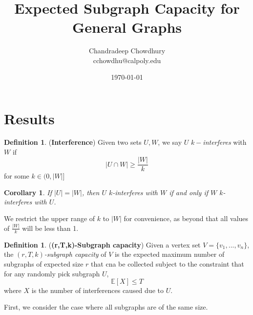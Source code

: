 \documentclass[10pt]{extarticle}
\title{\textbf{Expected Subgraph Capacity for General Graphs}}
\author{Chandradeep Chowdhury \\ cchowdhu@calpoly.edu}
\date{\today}
\newcommand{\E}{\mathbb{E}}
\newtheorem{corollary}[theorem]{Corollary}
\theoremstyle{definition}
\newtheorem{definition}[theorem]{Definition}
\begin{document}

\section{Results}

\begin{definition}
    (\textbf{Interference}) Given two sets $U, W$, we say $U$ $k-$\textit{interferes} with $W$ if 
    \begin{equation}
        |U \cap W| \ge  \frac{|W|}{k}
    \end{equation}
    for some $k \in (0,|W|]$
\end{definition}

\begin{corollary}
    If $|U| = |W|$, then $U$ $k$-interferes with $W$ if and only if $W$ $k$-interferes with $U$.
\end{corollary}

We restrict the upper range of $k$ to $|W|$ for convenience, as beyond that all values of $\frac{|W|}{k}$ will be less than 1.

\begin{definition} (\textbf{(r,T,k)-Subgraph capacity}) Given a vertex set $V = \{v_1,...,v_n\}$, the \textit{$(r,T,k)$-subgraph capacity} of $V$ is the expected maximum number of subgraphs of expected size $r$ that cna be collected subject to the constraint that for any randomly pick subgraph $U$, 
\begin{equation}
    \E[X] \le T
\end{equation}
where $X$ is the number of interferences caused due to $U$. 
\end{definition}

First, we consider the case where all subgraphs are of the same size.
\end{document}
